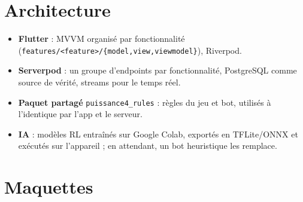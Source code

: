 \documentclass[a4paper,11pt]{article}
\begin{document}
\section{Architecture}

\begin{itemize}
  \item \textbf{Flutter} : MVVM organisé par fonctionnalité
        (\texttt{features/<feature>/\{model,view,viewmodel\}}), Riverpod.
  \item \textbf{Serverpod} : un groupe d'endpoints par fonctionnalité, PostgreSQL comme
        source de vérité, streams pour le temps réel.
  \item \textbf{Paquet partagé} \texttt{puissance4\_rules} : règles du jeu et bot,
        utilisés à l'identique par l'app et le serveur.
  \item \textbf{IA} : modèles RL entraînés sur Google Colab, exportés en TFLite/ONNX et
        exécutés sur l'appareil ; en attendant, un bot heuristique les remplace.
\end{itemize}

\section{Maquettes}
\end{document}
